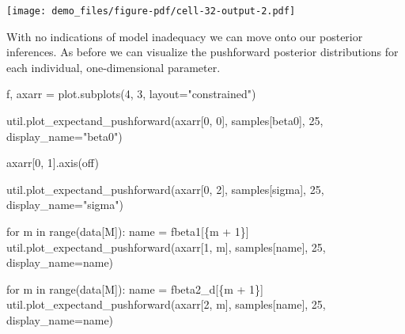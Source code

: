 \documentclass[
  letterpaper,
  DIV=11,
  numbers=noendperiod]{scrartcl}
\newenvironment{Shaded}{\begin{snugshade}}{\end{snugshade}}
\newcommand{\BuiltInTok}[1]{\textcolor[rgb]{0.00,0.23,0.31}{#1}}
\newcommand{\ControlFlowTok}[1]{\textcolor[rgb]{0.00,0.23,0.31}{#1}}
\newcommand{\DecValTok}[1]{\textcolor[rgb]{0.68,0.00,0.00}{#1}}
\newcommand{\KeywordTok}[1]{\textcolor[rgb]{0.00,0.23,0.31}{#1}}
\newcommand{\NormalTok}[1]{\textcolor[rgb]{0.00,0.23,0.31}{#1}}
\newcommand{\OperatorTok}[1]{\textcolor[rgb]{0.37,0.37,0.37}{#1}}
\newcommand{\SpecialCharTok}[1]{\textcolor[rgb]{0.37,0.37,0.37}{#1}}
\newcommand{\SpecialStringTok}[1]{\textcolor[rgb]{0.13,0.47,0.30}{#1}}
\newcommand{\StringTok}[1]{\textcolor[rgb]{0.13,0.47,0.30}{#1}}
\begin{document}
\texttt{[image: demo\_files/figure-pdf/cell-32-output-2.pdf]}

With no indications of model inadequacy we can move onto our posterior
inferences. As before we can visualize the pushforward posterior
distributions for each individual, one-dimensional parameter.

\begin{Shaded}
\begin{Highlighting}[]
\NormalTok{f, axarr }\OperatorTok{=}\NormalTok{ plot.subplots(}\DecValTok{4}\NormalTok{, }\DecValTok{3}\NormalTok{, layout}\OperatorTok{=}\StringTok{"constrained"}\NormalTok{)}

\NormalTok{util.plot\_expectand\_pushforward(axarr[}\DecValTok{0}\NormalTok{, }\DecValTok{0}\NormalTok{], samples[}\StringTok{\textquotesingle{}beta0\textquotesingle{}}\NormalTok{],}
                                \DecValTok{25}\NormalTok{, display\_name}\OperatorTok{=}\StringTok{"beta0"}\NormalTok{)}

\NormalTok{axarr[}\DecValTok{0}\NormalTok{, }\DecValTok{1}\NormalTok{].axis(}\StringTok{\textquotesingle{}off\textquotesingle{}}\NormalTok{)}

\NormalTok{util.plot\_expectand\_pushforward(axarr[}\DecValTok{0}\NormalTok{, }\DecValTok{2}\NormalTok{], samples[}\StringTok{\textquotesingle{}sigma\textquotesingle{}}\NormalTok{],}
                                \DecValTok{25}\NormalTok{, display\_name}\OperatorTok{=}\StringTok{"sigma"}\NormalTok{)}

\ControlFlowTok{for}\NormalTok{ m }\KeywordTok{in} \BuiltInTok{range}\NormalTok{(data[}\StringTok{\textquotesingle{}M\textquotesingle{}}\NormalTok{]):}
\NormalTok{  name }\OperatorTok{=} \SpecialStringTok{f\textquotesingle{}beta1[}\SpecialCharTok{\{}\NormalTok{m }\OperatorTok{+} \DecValTok{1}\SpecialCharTok{\}}\SpecialStringTok{]\textquotesingle{}}
\NormalTok{  util.plot\_expectand\_pushforward(axarr[}\DecValTok{1}\NormalTok{, m], samples[name],}
                                  \DecValTok{25}\NormalTok{, display\_name}\OperatorTok{=}\NormalTok{name)}

\ControlFlowTok{for}\NormalTok{ m }\KeywordTok{in} \BuiltInTok{range}\NormalTok{(data[}\StringTok{\textquotesingle{}M\textquotesingle{}}\NormalTok{]):}
\NormalTok{  name }\OperatorTok{=} \SpecialStringTok{f\textquotesingle{}beta2\_d[}\SpecialCharTok{\{}\NormalTok{m }\OperatorTok{+} \DecValTok{1}\SpecialCharTok{\}}\SpecialStringTok{]\textquotesingle{}}
\NormalTok{  util.plot\_expectand\_pushforward(axarr[}\DecValTok{2}\NormalTok{, m], samples[name],}
                                  \DecValTok{25}\NormalTok{, display\_name}\OperatorTok{=}\NormalTok{name)}


\end{Highlighting}
\end{Shaded}
\end{document}

